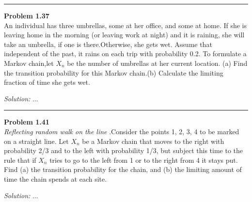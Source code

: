 \documentclass[a4paper, 11pt]{article}
\newenvironment{problem}[2][Problem]
    { \begin{mdframed}[backgroundcolor=gray!20] \textbf{#1 #2} \\}
    {  \end{mdframed}}
\newenvironment{solution}
    {\textit{Solution:}}
    {}
\begin{document}
\noindent\rule{7in}{2.8pt}
\begin{problem}{1.37}
    An individual has three umbrellas, some at her office, and some at home. 
    If she is leaving home in the morning (or leaving work at night) and it is raining, she will take an umbrella, 
    if one is there.Otherwise, she gets wet. Assume that independent of the past, it rains on each trip with probability 0.2.
    To formulate a Markov chain,let $X_n$ be the number of umbrellas at her current location. 
    (a) Find the transition probability for this Markov chain.(b) Calculate the limiting fraction of time she gets wet.
\end{problem}
\begin{solution}
...
\end{solution}

\noindent\rule{7in}{2.8pt}
\begin{problem}{1.41}
    \textit{Reflecting random walk on the line} .Consider the points 1, 2, 3, 4 to be marked on a straight line. 
    Let $X_n$ be a Markov chain that moves to the right with probability 2/3 and to the left with probability 1/3,
    but subject this time to the rule that if $X_n$ tries to go to the left from 1 or to the right from 4 it stays put.
    Find (a) the transition probability for the chain, and (b) the limiting amount of time the chain spends at each site. 
\end{problem}
\begin{solution}
...
\end{solution}
\end{document}
